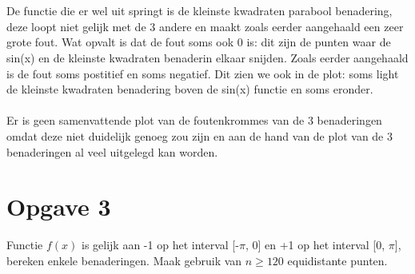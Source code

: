 \documentclass[10pt,a4paper]{article}
\begin{document}
\\
\\
De functie die er wel uit springt is de kleinste kwadraten parabool benadering, deze loopt niet gelijk met de 3 andere en maakt zoals eerder aangehaald een zeer grote fout. Wat opvalt is dat de fout soms ook 0 is: dit zijn de punten waar de sin(x) en de kleinste kwadraten benaderin elkaar snijden. Zoals eerder aangehaald is de fout soms postitief en soms negatief. Dit zien we ook in de plot: soms light de kleinste kwadraten benadering boven de sin(x) functie en soms eronder.
\\
\\
Er is geen samenvattende plot van de foutenkrommes van de 3 benaderingen omdat deze niet duidelijk genoeg zou zijn en aan de hand van de plot van de 3 benaderingen al veel uitgelegd kan worden.
\section{Opgave 3}
Functie $f(x)$ is gelijk aan -1 op het interval [-$\pi$, 0] en +1 op het interval [0, $\pi$], bereken enkele benaderingen. Maak gebruik van $n \geq 120$ equidistante punten.
\end{document}
